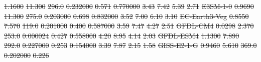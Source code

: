 \documentclass[gmd, manuscript]{copernicus}
\providecommand{\DIFdel}[1]{{\protect\color{red}\sout{#1}}}                      %
\providecommand{\DIFdelFL}[1]{\DIFdel{#1}} %
\begin{document}
\begin{table}[t]
{\DIFdelFL{1.1600 }%
\DIFdelFL{11.300 }%
\DIFdelFL{296.0 }%
\DIFdelFL{0.232000 }%
\DIFdelFL{0.571 }%
\DIFdelFL{0.770000 }%
\DIFdelFL{3.43 }%
\DIFdelFL{7.42 }%
\DIFdelFL{5.39 }%
\DIFdelFL{2.71 }%
\DIFdelFL{E3SM-1-0        }%
\DIFdelFL{0.9690 }%
\DIFdelFL{11.300 }%
\DIFdelFL{275.0 }%
\DIFdelFL{0.203000 }%
\DIFdelFL{0.698 }%
\DIFdelFL{0.832000 }%
\DIFdelFL{3.52 }%
\DIFdelFL{7.00 }%
\DIFdelFL{6.10 }%
\DIFdelFL{3.10 }%
\DIFdelFL{EC-Earth3-Veg   }%
\DIFdelFL{0.8550 }%
\DIFdelFL{7.570 }%
\DIFdelFL{119.0 }%
\DIFdelFL{0.201000 }%
\DIFdelFL{0.400 }%
\DIFdelFL{0.587000 }%
\DIFdelFL{3.59 }%
\DIFdelFL{7.47 }%
\DIFdelFL{4.27 }%
\DIFdelFL{2.51 }%
\DIFdelFL{GFDL-CM4        }%
\DIFdelFL{0.0298 }%
\DIFdelFL{2.370 }%
\DIFdelFL{253.0 }%
\DIFdelFL{0.000024 }%
\DIFdelFL{0.427 }%
\DIFdelFL{0.558000 }%
\DIFdelFL{4.20 }%
\DIFdelFL{8.95 }%
\DIFdelFL{4.14 }%
\DIFdelFL{2.03 }%
\DIFdelFL{GFDL-ESM4       }%
\DIFdelFL{1.1300 }%
\DIFdelFL{7.890 }%
\DIFdelFL{292.0 }%
\DIFdelFL{0.227000 }%
\DIFdelFL{0.253 }%
\DIFdelFL{0.154000 }%
\DIFdelFL{3.39 }%
\DIFdelFL{7.87 }%
\DIFdelFL{2.15 }%
\DIFdelFL{1.58 }%
\DIFdelFL{GISS-E2-1-G     }%
\DIFdelFL{0.9460 }%
\DIFdelFL{5.610 }%
\DIFdelFL{369.0 }%
\DIFdelFL{0.202000 }%
\DIFdelFL{0.226 }%
}
\end{table}
\end{document}
